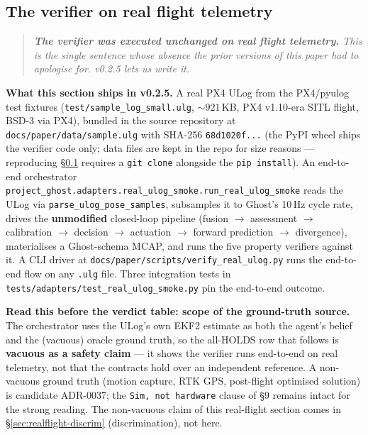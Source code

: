 \documentclass[11pt,a4paper]{article}
\begin{document}
\subsection{The verifier on real flight telemetry}
\label{sec:realflight}

\begin{quote}
\itshape
\textbf{The verifier was executed unchanged on real flight
telemetry.} This is the single sentence whose absence the prior
versions of this paper had to apologise for. v0.2.5 lets us write
it.
\end{quote}

\textbf{What this section ships in v0.2.5.} A real PX4 ULog from
the PX4/pyulog test fixtures
(\texttt{test/sample\_log\_small.ulg}, ${\sim}921$\,KB, PX4 v1.10-era
SITL flight, BSD-3 via PX4), bundled in the source repository at
\texttt{docs/paper/data/sample.ulg} with SHA-256
\texttt{68d1020f...} (the PyPI wheel ships the verifier code only;
data files are kept in the repo for size reasons --- reproducing
\S\ref{sec:realflight} requires a \texttt{git clone} alongside the
\texttt{pip install}). An end-to-end orchestrator
\texttt{project\_ghost.adapters.real\_ulog\_smoke.run\_real\_ulog\_smoke}
reads the ULog via \texttt{parse\_ulog\_pose\_samples}, subsamples
it to Ghost's 10\,Hz cycle rate, drives the \textbf{unmodified}
closed-loop pipeline (fusion $\to$ assessment $\to$ calibration
$\to$ decision $\to$ actuation $\to$ forward prediction $\to$
divergence), materialises a Ghost-schema MCAP, and runs the five
property verifiers against it. A CLI driver at
\texttt{docs/paper/scripts/verify\_real\_ulog.py} runs the
end-to-end flow on any \texttt{.ulg} file. Three integration tests
in \texttt{tests/adapters/test\_real\_ulog\_smoke.py} pin the
end-to-end outcome.

\textbf{Read this before the verdict table: scope of the
ground-truth source.} The orchestrator uses the ULog's own EKF2
estimate as both the agent's belief and the (vacuous) oracle
ground truth, so the all-HOLDS row that follows is \textbf{vacuous
as a safety claim} --- it shows the verifier runs end-to-end on
real telemetry, not that the contracts hold over an independent
reference. A non-vacuous ground truth (motion capture, RTK GPS,
post-flight optimised solution) is candidate ADR-0037; the
\texttt{Sim, not hardware} clause of \S9 remains intact for the
strong reading. The non-vacuous claim of this real-flight section
comes in \S\ref{sec:realflight-discrim} (discrimination), not
here.
\end{document}
